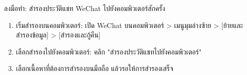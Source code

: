 \begin{tcbpractice}{ลงมือทำ: สำรองประวัติแชท WeChat ไปยังคอมพิวเตอร์สักครั้ง}
\begin{enumerate}
  \item เริ่มสำรองบนคอมพิวเตอร์: เปิด WeChat บนคอมพิวเตอร์ > เมนูมุมล่างซ้าย > [ย้ายและสำรองข้อมูล] > [สำรองและกู้คืน]
  \item เลือกสำรองไปยังคอมพิวเตอร์: คลิก "สำรองประวัติแชทไปยังคอมพิวเตอร์"
  \item เลือกเนื้อหาที่ต้องการสำรองบนมือถือ แล้วรอให้การสำรองเสร็จ
\end{enumerate}

\end{tcbpractice}
